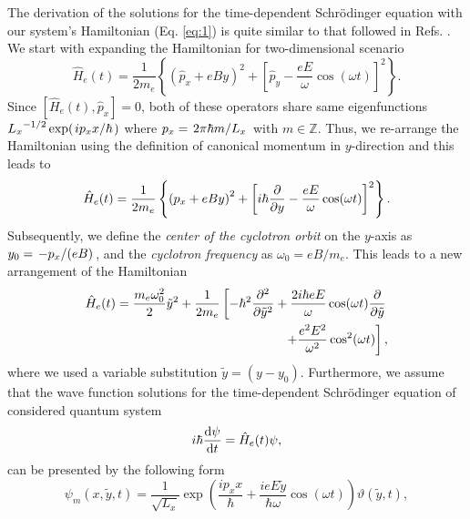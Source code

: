\documentclass[
 reprint,
 amsmath,amssymb,
 aps,
 prb,
]{revtex4-2}
\begin{document}
The derivation of the solutions for the time-dependent Schrödinger equation with our system's Hamiltonian (Eq. \ref{eq:1}) is quite similar to that followed in Refs. \cite{husimi53,dini16}. We start with expanding the Hamiltonian for two-dimensional scenario
\begin{equation} \label{eq:a1}
  \hat{H}_e(t) = \frac{1}{2m_e}
  \left\{
    \left(\hat{p}_x + eBy \right)^2 +
    \left[
      \hat{p}_y - \frac{eE}{\omega}\cos(\omega t)
    \right]^2
  \right\}.
\end{equation}
Since $\left[\hat{H}_e(t),\hat{p}_x \right] =0$, both of these operators share same eigenfunctions
${L_x}^{-1/2}\exp(\flatfrac{ip_x x}{\hbar})$ where $p_x = \flatfrac{2\pi \hbar m}{L_x}$ with $ m \in \mathbb{Z}$.
Thus, we re-arrange the Hamiltonian using the definition of canonical momentum in $y$-direction and this leads to
\begin{equation} \label{eq:a2}
    \hat{H}_e(t) = \frac{1}{2m_e}
    \left\{
      \left({p}_x + eBy \right)^2 +
      \left[
        i\hbar \pdv{y}- \frac{eE}{\omega}\cos(\omega t)
      \right]^2
    \right\}.
\end{equation}
Subsequently, we define the \textit{center of the cyclotron orbit} on the $y$-axis as $y_0 = \flatfrac{-p_x}{(eB)}$, and the \textit{cyclotron frequency} as  $\omega_0 = {eB}/{m_e}$. This leads to a new arrangement of the Hamiltonian
\begin{equation} \label{eq:a3}
  \begin{aligned}
    \hat{H}_e(t) =
      \frac{m_e \omega_0^2}{2}\tilde{y}^2 +
      \frac{1}{2m_e} &
      \left[
        -\hbar^2 \pdv[2]{\tilde{y}}  +
        \frac{2i\hbar eE}{\omega} \cos(\omega t) \pdv{\tilde{y}}
        \right.\\
        & \left. \qquad\qquad\quad +
        \frac{e^2E^2}{\omega^2}\cos[2](\omega t)
        \right],
  \end{aligned}
\end{equation}
where we used a variable substitution $\tilde{y} = (y - y_0)$. Furthermore, we assume that the wave function solutions for the time-dependent Schrödinger equation of considered quantum system
\begin{equation} \label{eq:a4}
    i \hbar \dv{\psi}{t} = \hat{H}_e(t)\psi,
\end{equation}
can be presented by the following form
\begin{equation} \label{eq:a5}
    \psi_m(x,\tilde{y},t) = \frac{1}{\sqrt{L_x}}
    \exp\left(
      \frac{ip_x x}{\hbar} +
      \frac{ieE\tilde{y}}{\hbar \omega}\cos(\omega t)
    \right) \vartheta(\tilde{y},t),
\end{equation}
\end{document}
